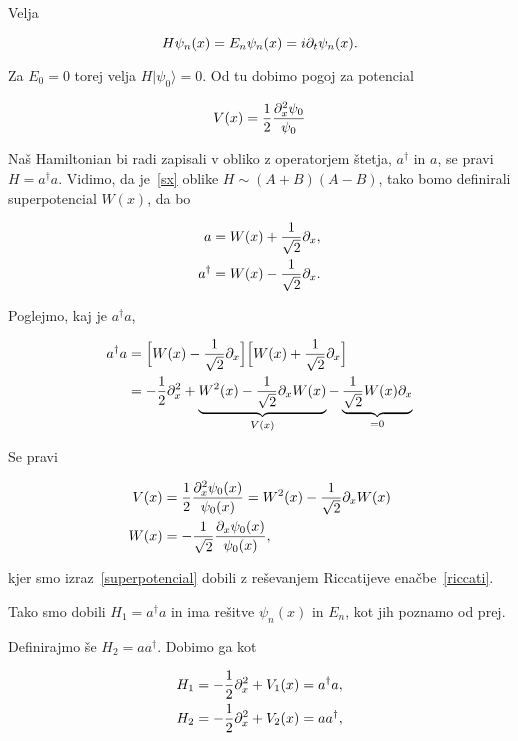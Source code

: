 Velja

\begin{equation}
	H\psi_n(x) = E_n\psi_n(x) = i\partial_t\psi_n(x).
\end{equation}

Za $E_0 = 0$ torej velja $H|\psi_0\rangle = 0$. Od tu dobimo pogoj za potencial

\begin{equation}
	V(x) = \frac{1}{2}\frac{\partial_x^2\psi_0}{\psi_0}
	\label{vpogoj}
\end{equation}

Naš Hamiltonian bi radi zapisali v obliko z operatorjem štetja, $a^\dagger$ in $a$, se pravi
$H = a^\dagger a$. Vidimo, da je~\eqref{sx} oblike $H \sim (A + B)(A - B)$, tako bomo
definirali superpotencial $W(x)$, da bo

\begin{align}
	a &= W(x) + \frac{1}{\sqrt{2}}\partial_x, \\
	a^\dagger &= W(x) - \frac{1}{\sqrt{2}}\partial_x.
\end{align}

Poglejmo, kaj je $a^\dagger a$,

\begin{align}
	a^\dagger a &= \Big[W(x) - \frac{1}{\sqrt{2}}\partial_x\Big]\Big[W(x) +
		\frac{1}{\sqrt{2}}\partial_x\Big] \\
	&= -\frac{1}{2}\partial_x^2 + \underbrace{W^2(x) - \frac{1}{\sqrt{2}}\partial_x W(x)}_{V(x)}
		-\underbrace{\frac{1}{\sqrt{2}}W(x)\partial_x}_{=0}
\end{align}

Se pravi

\begin{align}
	V(x) &=\frac{1}{2}\frac{\partial_x^2\psi_0(x)}{\psi_0(x)} = W^2(x) - \frac{1}{\sqrt{2}}\partial_x
		W(x) \label{riccati} \\
	W(x) &= -\frac{1}{\sqrt{2}}\frac{\partial_x\psi_0(x)}{\psi_0(x)} \label{superpotencial},
\end{align}

kjer smo izraz~\eqref{superpotencial} dobili z reševanjem Riccatijeve enačbe~\eqref{riccati}.

Tako smo dobili $H_1 = a^\dagger a$ in ima rešitve $\psi_n(x)$ in $E_n$, kot jih poznamo
od prej.

Definirajmo še $H_2 = aa^\dagger$. Dobimo ga kot

\begin{align}
	H_1 &= -\frac{1}{2}\partial_x^2 + V_1(x) = a^\dagger a, \\
	H_2 &= -\frac{1}{2}\partial_x^2 + V_2(x) = aa^\dagger,
\end{align}

